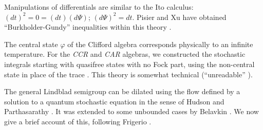 Manipulations of differentials
are similar to the Ito calculus: $(dt)^2=0=(dt)(d\Psi)$; $(d\Psi)^2=dt$.
Pisier and Xu have obtained ``Burkholder-Gundy'' inequalities
within this theory \cite{Pisier}.

The central state $\varphi$ of the Clifford algebra corresponds physically
to an infinite temperature.
For the {\em CCR} and {\em CAR} algebras, we constructed the stochastic
integrals starting with quasifree states with no Fock part, using the
non-central state in place of the trace \cite{Barnett4,Lindsay}. This theory
is somewhat technical (``unreadable'' \cite{Meyer2}).

The general Lindblad semigroup can be dilated \cite{Evans}
using the flow defined by a solution to a quantum stochastic equation in
the sense of Hudson and Parthasarathy \cite{Hudson3,Partha2,Smith}.
It was extended to some unbounded cases by Belavkin \cite{Belavkin}.
We now give a brief account of this, following Frigerio \cite{Frigerio}.

